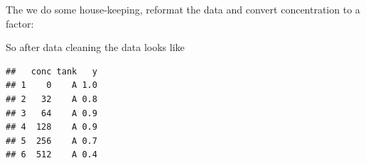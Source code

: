 The we do some house-keeping, reformat the data and convert concentration to a factor:

\begin{knitrout}
\color{fgcolor}\small\begin{kframe}
\begin{alltt}
 \hlkwb{<-}   \hlstd{=} \hlstd{,}  \hlstd{=} \hlstd{,} 
                 \hlstd{=} \hlstd{)}
\hlopt{$} \hlkwb{<-} \hlopt{$}
\end{alltt}
\end{kframe}
\end{knitrout}

So after data cleaning the data looks like
\begin{knitrout}
\color{fgcolor}\small\begin{kframe}
\begin{alltt}
\end{alltt}
\begin{verbatim}
##   conc tank   y
## 1    0    A 1.0
## 2   32    A 0.8
## 3   64    A 0.9
## 4  128    A 0.9
## 5  256    A 0.7
## 6  512    A 0.4
\end{verbatim}
\end{kframe}
\end{knitrout}

